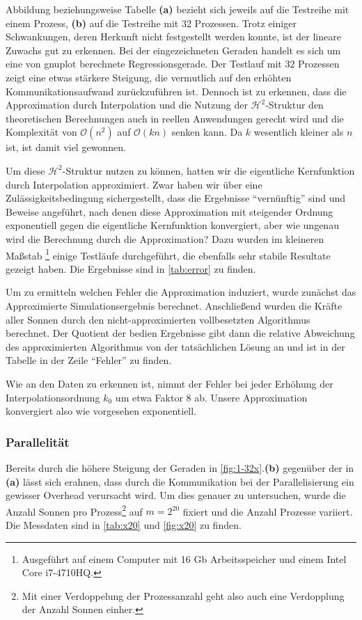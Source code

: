   Abbildung beziehungsweise Tabelle \textbf{(a)} bezieht sich jeweils auf die Testreihe mit einem Prozess, \textbf{(b)} auf die Testreihe mit 32 Prozessen. Trotz einiger Schwankungen, deren Herkunft
  nicht festgestellt werden konnte, ist der lineare Zuwachs gut zu erkennen. Bei der eingezeichneten Geraden handelt es sich um eine von gnuplot berechnete Regressionsgerade. Der Testlauf mit $32$ 
  Prozessen zeigt eine etwas stärkere Steigung, die vermutlich auf den erhöhten Kommunikationsaufwand zurückzuführen ist. Dennoch ist zu erkennen, dass die Approximation durch Interpolation und die 
  Nutzung der $\mathcal{H}^2$-Struktur den theoretischen Berechnungen auch in reellen Anwendungen gerecht wird und die Komplexität von $\mathcal{O}(n^2)$ auf $\mathcal{O}(k n)$ senken kann. Da $k$ 
  wesentlich kleiner als $n$ ist, ist damit viel gewonnen.
  
  Um diese $\mathcal{H}^2$-Struktur nutzen zu können, hatten wir die eigentliche Kernfunktion durch Interpolation approximiert. Zwar haben wir über eine Zulässigkeitsbedingung sichergestellt, dass die 
  Ergebnisse ``vernünftig'' sind und Beweise angeführt, nach denen diese Approximation mit steigender Ordnung exponentiell gegen die eigentliche Kernfunktion konvergiert, aber wie ungenau wird die
  Berechnung durch die Approximation? Dazu wurden im kleineren Maßstab
  \footnote{Ausgeführt auf einem Computer mit 16 Gb Arbeitsspeicher und einem Intel Core i7-4710HQ.} 
  einige Testläufe durchgeführt, 
  die ebenfalls sehr stabile Resultate gezeigt haben. Die Ergebnisse sind in \autoref{tab:error} zu finden.
  
  Um zu ermitteln welchen Fehler die Approximation induziert, wurde zunächst das Approximierte Simulationsergebnis berechnet. Anschließend wurden die Kräfte aller Sonnen durch den nicht-approximierten
  vollbesetzten Algorithmus berechnet. Der Quotient der bedien Ergebnisse gibt dann die relative Abweichung des approximierten Algorithmus von der tatsächlichen Lösung an und ist in der Tabelle
  in der Zeile ``Fehler'' zu finden.
  
  Wie an den Daten zu erkennen ist, nimmt der Fehler bei jeder Erhöhung der Interpolationsordnung $k_0$ um etwa Faktor $8$ ab. Unsere Approximation konvergiert also wie vorgesehen exponentiell. 
  
  \subsubsection{Parallelität}
  
  Bereits durch die höhere Steigung der Geraden in \autoref{fig:1-32x}.\textbf{(b)} gegenüber der in \textbf{(a)} lässt sich erahnen, dass durch die Kommunikation bei der Parallelisierung ein gewisser
  Overhead verursacht wird. Um dies genauer zu untersuchen, wurde die Anzahl Sonnen pro Prozess\footnote{Mit einer Verdoppelung der Prozessanzahl geht also auch eine Verdopplung der Anzahl Sonnen 
  einher.} auf $m = 2^{20}$ fixiert und die Anzahl Prozesse variiert.  Die Messdaten sind in \autoref{tab:x20} und \autoref{fig:x20} zu finden. 
  
